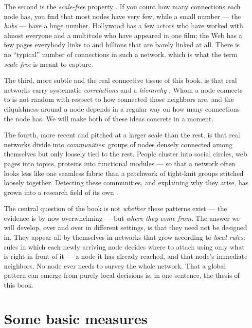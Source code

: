 The second is the \emph{scale-free} property \citep{barabasi1999,faloutsos1999}.
If you count how many connections each node has, you find that most nodes have
very few, while a small number --- the \emph{hubs} --- have a huge number.
Hollywood has a few actors who have worked with almost everyone and a multitude
who have appeared in one film; the Web has a few pages everybody links to and
billions that are barely linked at all. There is no ``typical'' number of
connections in such a network, which is what the term \emph{scale-free} is
meant to capture.

The third, more subtle and the real connective tissue of this book, is that real
networks carry systematic \emph{correlations} and a \emph{hierarchy}
\citep{pastorsatorras2001,vazquez2002,ravasz2003,vazquez2025}. Whom a node
connects to is not random with respect to how connected those neighbors are, and
the cliquishness around a node depends in a regular way on how many connections
the node has. We will make both of these ideas concrete in a moment.

The fourth, more recent and pitched at a larger scale than the rest, is that real
networks divide into \emph{communities}: groups of nodes densely connected among
themselves but only loosely tied to the rest. People cluster into social circles,
web pages into topics, proteins into functional modules --- so that a network
often looks less like one seamless fabric than a patchwork of tight-knit groups
stitched loosely together. Detecting these communities, and explaining why they
arise, has grown into a research field of its own
\citep{girvan2002,fortunato2010,palla2005}.

The central question of the book is not \emph{whether} these patterns exist ---
the evidence is by now overwhelming --- but \emph{where they come from}. The
answer we will develop, over and over in different settings, is that they need
not be designed in. They appear all by themselves in networks that grow
according to \emph{local rules}: rules in which each newly arriving node decides
where to attach using only what is right in front of it --- a node it has already
reached, and that node's immediate neighbors. No node ever needs to survey the
whole network. That a global pattern can emerge from purely local decisions is,
in one sentence, the thesis of this book.

\section{Some basic measures}

